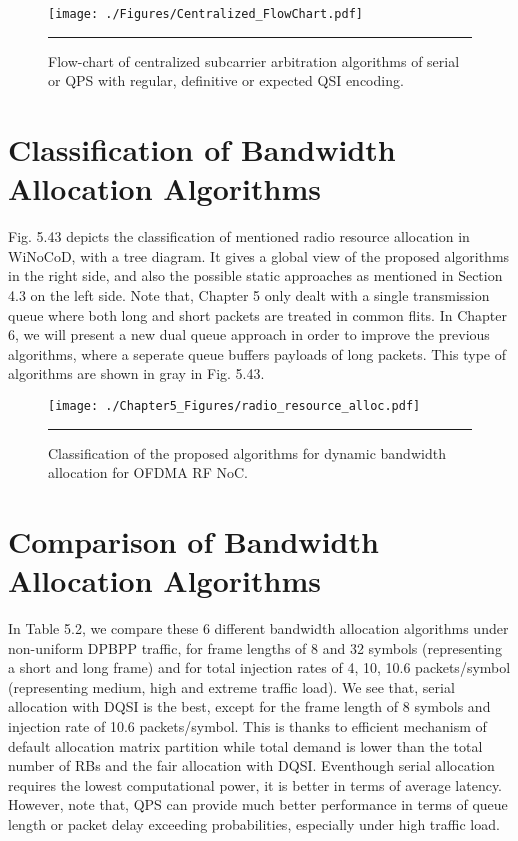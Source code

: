 \begin{figure}[htbp]
  \centering
    \texttt{[image: ./Figures/Centralized\_FlowChart.pdf]}
    \rule{35em}{0.5pt}
  \caption[Flow-chart of centralized subcarrier arbitration algorithms of serial or QPS with regular, definitive or expected QSI encoding.]{Flow-chart of centralized subcarrier arbitration algorithms of serial or QPS with regular, definitive or expected QSI encoding.} 
  \label{fig:Electron}
\end{figure}

\section{Classification of Bandwidth Allocation Algorithms}

Fig. 5.43 depicts the classification of mentioned radio resource allocation in WiNoCoD, with a tree diagram. It gives a global view of the proposed algorithms in the right side, and also the possible static approaches as mentioned in Section 4.3 on the left side. Note that, Chapter 5 only dealt with a single transmission queue where both long and short packets are treated in common flits. In Chapter 6, we will present a new dual queue approach in order to improve the previous algorithms, where a seperate queue buffers payloads of long packets. This type of algorithms are shown in gray in Fig. 5.43. 

\begin{figure}[htbp]
  \centering
    \texttt{[image: ./Chapter5\_Figures/radio\_resource\_alloc.pdf]}
    \rule{35em}{0.5pt}
  \caption[Classification of the proposed algorithms for dynamic bandwidth allocation for OFDMA RF NoC.]{Classification of the proposed algorithms for dynamic bandwidth allocation for OFDMA RF NoC.} 
  \label{fig:Electron}
\end{figure}

\section{Comparison of Bandwidth Allocation Algorithms}


In Table 5.2, we compare these 6 different bandwidth allocation algorithms under non-uniform DPBPP traffic, for frame lengths of 8 and 32 symbols (representing a short and long frame) and for total injection rates of 4, 10, 10.6 packets/symbol (representing medium, high and extreme traffic load). We see that, serial allocation with DQSI is the best, except for the frame length of 8 symbols and injection rate of 10.6 packets/symbol. This is thanks to efficient mechanism of default allocation matrix partition while total demand is lower than the total number of RBs and the fair allocation with DQSI. Eventhough serial allocation requires the lowest computational power, it is better in terms of average latency. However, note that, QPS can provide much better performance in terms of queue length or packet delay exceeding probabilities, especially under high traffic load.



